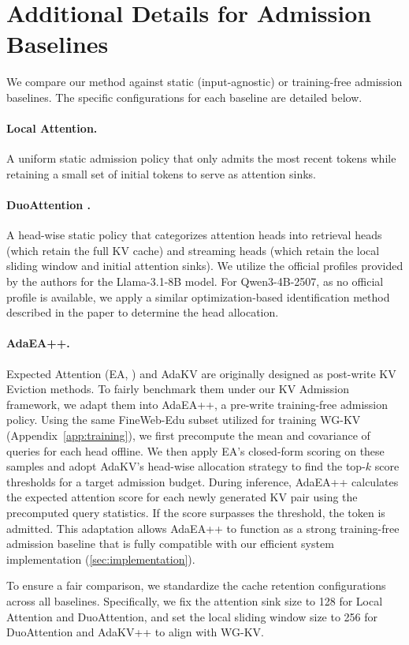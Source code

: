 \section{Additional Details for Admission Baselines}
\label{app:baseline}

We compare our method against static (input-agnostic) or training-free admission baselines. The specific configurations for each baseline are detailed below.

\paragraph{Local Attention.} A uniform static admission policy that only admits the most recent tokens while retaining a small set of initial tokens \cite{streamingllm} to serve as attention sinks.

\paragraph{DuoAttention \cite{duoattn}.} A head-wise static policy that categorizes attention heads into retrieval heads (which retain the full KV cache) and streaming heads (which retain the local sliding window and initial attention sinks). We utilize the official profiles provided by the authors for the Llama-3.1-8B model. For Qwen3-4B-2507, as no official profile is available, we apply a similar optimization-based identification method described in the paper to determine the head allocation.

\paragraph{AdaEA++.} Expected Attention (EA, \citealp{expectedattn}) and AdaKV \cite{adakv} are originally designed as post-write KV Eviction methods. To fairly benchmark them under our KV Admission framework, we adapt them into AdaEA++, a pre-write training-free admission policy. Using the same FineWeb-Edu subset utilized for training WG-KV (Appendix~\ref{app:training}), we first precompute the mean and covariance of queries for each head offline. We then apply EA's closed-form scoring on these samples and adopt AdaKV's head-wise allocation strategy to find the top-$k$ score thresholds for a target admission budget.  During inference, AdaEA++ calculates the expected attention score for each newly generated KV pair using the precomputed query statistics. If the score surpasses the threshold, the token is admitted. This adaptation allows AdaEA++ to function as a strong training-free admission baseline that is fully compatible with our efficient system implementation (\cref{sec:implementation}).

\myParagraphWithoutTitle To ensure a fair comparison, we standardize the cache retention configurations across all baselines. Specifically, we fix the attention sink size to 128 for Local Attention and DuoAttention, and set the local sliding window size to 256 for DuoAttention and AdaKV++ to align with WG-KV. 